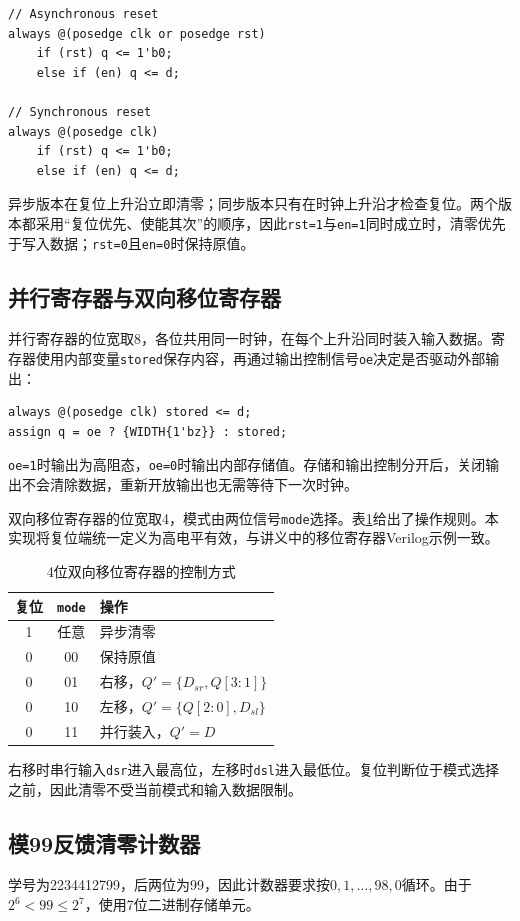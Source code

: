 \documentclass[12pt,a4paper]{ctexart}
\begin{document}
\begin{lstlisting}
// Asynchronous reset
always @(posedge clk or posedge rst)
    if (rst) q <= 1'b0;
    else if (en) q <= d;

// Synchronous reset
always @(posedge clk)
    if (rst) q <= 1'b0;
    else if (en) q <= d;
\end{lstlisting}
异步版本在复位上升沿立即清零；同步版本只有在时钟上升沿才检查复位。两个版本都采用“复位优先、使能其次”的顺序，因此\texttt{rst=1}与\texttt{en=1}同时成立时，清零优先于写入数据；\texttt{rst=0}且\texttt{en=0}时保持原值。

\subsection{并行寄存器与双向移位寄存器}
并行寄存器的位宽取8，各位共用同一时钟，在每个上升沿同时装入输入数据。寄存器使用内部变量\texttt{stored}保存内容，再通过输出控制信号\texttt{oe}决定是否驱动外部输出：
\begin{lstlisting}
always @(posedge clk) stored <= d;
assign q = oe ? {WIDTH{1'bz}} : stored;
\end{lstlisting}
\texttt{oe=1}时输出为高阻态，\texttt{oe=0}时输出内部存储值。存储和输出控制分开后，关闭输出不会清除数据，重新开放输出也无需等待下一次时钟。

双向移位寄存器的位宽取4，模式由两位信号\texttt{mode}选择。表\ref{tab:shift}给出了操作规则。本实现将复位端统一定义为高电平有效，与讲义中的移位寄存器Verilog示例一致。
\begin{table}[H]
\centering
\caption{4位双向移位寄存器的控制方式}
\label{tab:shift}
\begin{tabular}{ccl}
\toprule
复位 & \texttt{mode} & 操作\\
\midrule
1 & 任意 & 异步清零\\
0 & 00 & 保持原值\\
0 & 01 & 右移，$Q' = \{D_{sr},Q[3:1]\}$\\
0 & 10 & 左移，$Q' = \{Q[2:0],D_{sl}\}$\\
0 & 11 & 并行装入，$Q'=D$\\
\bottomrule
\end{tabular}
\end{table}
右移时串行输入\texttt{dsr}进入最高位，左移时\texttt{dsl}进入最低位。复位判断位于模式选择之前，因此清零不受当前模式和输入数据限制。

\subsection{模99反馈清零计数器}
学号为2234412799，后两位为99，因此计数器要求按$0,1,\ldots,98,0$循环。由于$2^6<99\leq2^7$，使用7位二进制存储单元。
\end{document}
